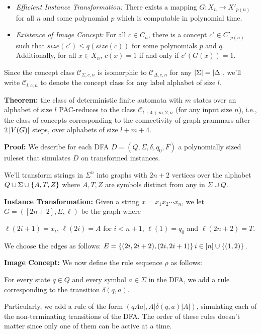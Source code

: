 \documentclass[]{article}
\providecommand{\tightlist}{%
  \setlength{\itemsep}{0pt}\setlength{\parskip}{0pt}}
\def\Concepts{\mathcal{C}\xspace}
\begin{document}
\begin{itemize}
\tightlist
\item
  \emph{Efficient Instance Transformation:} There exists a mapping
  \(G: X_n \to X'_{p(n)}\) for all \(n\) and some polynomial \(p\) which
  is computable in polynomial time.
\item
  \emph{Existence of Image Concept:} For all \(c \in C_n\), there is a
  concept \(c' \in C'_{p(n)}\) such that \(size(c') \leq q(size(c))\)
  for some polynomials \(p\) and \(q\). Additionally, for all
  \(x \in X_n\), \(c(x) = 1\) if and only if \(c'(G(x)) = 1\).
\end{itemize}

Since the concept class $\Concepts_{\Sigma,c,n}$ is isomorphic to $\Concepts_{\Delta,c,n}$ for any $\left| \Sigma \right| = \left| \Delta \right|$, we'll write $\Concepts_{l,c,n}$ to denote the concept class for any label alphabet of size $l$. 

\textbf{Theorem:} the class of deterministic finite automata with $m$ states
over an alphabet of size $l$ PAC-reduces to the class $\Concepts_{l+4+m,2,n}$ (for any input size $n$),
i.e., the class of concepts corresponding to the connectivity of graph grammars
after $2\left| V(G) \right|$ steps, over alphabets of size $l+m+4$.

\textbf{Proof:}
We describe for each DFA $D=(Q,\Sigma,\delta,q_0,F)$ a polynomially sized ruleset that
simulates \(D\) on transformed instances.

We'll transform strings in $\Sigma^n$ into graphs with $2n+2$ vertices over the alphabet $Q\cup\Sigma\cup \left\{ A,T,Z \right\}$ where $A,T,Z$ are symbols distinct from any in $\Sigma\cup Q$.

\textbf{Instance Transformation:} 
Given a string $x = x_1x_2\dotsm x_n$, we let $G = ([2n+2],E,\ell)$ be the graph where

$\ell(2i+1) = x_i$, $\ell(2i) = A$ for $i < n+1$, $\ell(1) = q_0$ and $\ell(2n+2) = T$.

We choose the edges as follows: $E = \left\{ (2i,2i+2),(2i,2i+1) \right\}{i\in [n]} \cup \left\{ (1,2) \right\}$.

\textbf{Image Concept:}
We now define the rule sequence $\rho$ as follows:

For every state $q\in Q$ and every symbol $a\in \Sigma$ in the DFA, we add a rule corresponding to the transition $\delta(q,a)$.

Particularly, we add a rule of the form $(qAa|, A|\delta(q,a)|A|)$, simulating
each of the non-terminating transitions of the DFA. The order of
these rules doesn't matter since only one of them can be active at a time.
\end{document}

